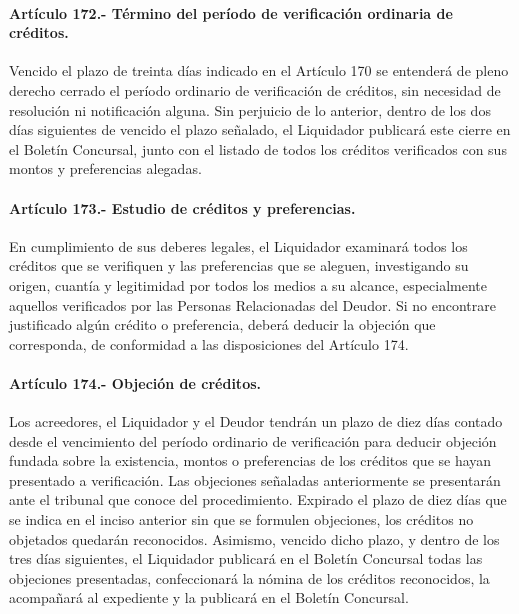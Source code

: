 \documentclass[
]{book}
\begin{document}
\hypertarget{artuxedculo-172.--tuxe9rmino-del-peruxedodo-de-verificaciuxf3n-ordinaria-de-cruxe9ditos.}{%
\paragraph*{Artículo 172.- Término del período de verificación ordinaria de créditos.}\label{artuxedculo-172.--tuxe9rmino-del-peruxedodo-de-verificaciuxf3n-ordinaria-de-cruxe9ditos.}}

Vencido el plazo de treinta días indicado en el Artículo 170 se entenderá de pleno derecho cerrado el período ordinario de verificación de créditos, sin necesidad de resolución ni notificación alguna. Sin perjuicio de lo anterior, dentro de los dos días siguientes de vencido el plazo señalado, el Liquidador publicará este cierre en el Boletín Concursal, junto con el listado de todos los créditos verificados con sus montos y preferencias alegadas.

\hypertarget{artuxedculo-173.--estudio-de-cruxe9ditos-y-preferencias.}{%
\paragraph*{Artículo 173.- Estudio de créditos y preferencias.}\label{artuxedculo-173.--estudio-de-cruxe9ditos-y-preferencias.}}

En cumplimiento de sus deberes legales, el Liquidador examinará todos los créditos que se verifiquen y las preferencias que se aleguen, investigando su origen, cuantía y legitimidad por todos los medios a su alcance, especialmente aquellos verificados por las Personas Relacionadas del Deudor. Si no encontrare justificado algún crédito o preferencia, deberá deducir la objeción que corresponda, de conformidad a las disposiciones del Artículo 174.

\hypertarget{artuxedculo-174.--objeciuxf3n-de-cruxe9ditos.}{%
\paragraph*{Artículo 174.- Objeción de créditos.}\label{artuxedculo-174.--objeciuxf3n-de-cruxe9ditos.}}

Los acreedores, el Liquidador y el Deudor tendrán un plazo de diez días contado desde el vencimiento del período ordinario de verificación para deducir objeción fundada sobre la existencia, montos o preferencias de los créditos que se hayan presentado a verificación.
Las objeciones señaladas anteriormente se presentarán ante el tribunal que conoce del procedimiento. Expirado el plazo de diez días que se indica en el inciso anterior sin que se formulen objeciones, los créditos no objetados quedarán reconocidos. Asimismo, vencido dicho plazo, y dentro de los tres días siguientes, el Liquidador publicará en el Boletín Concursal todas las objeciones presentadas, confeccionará la nómina de los créditos reconocidos, la acompañará al expediente y la publicará en el Boletín Concursal.
\end{document}
